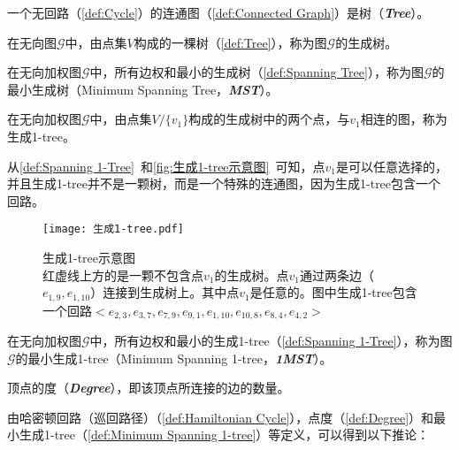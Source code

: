 \begin{definition}[树]
    \label{def:Tree}
    一个无回路（\autoref{def:Cycle}）的连通图（\autoref{def:Connected Graph}）是树（\emph{\textbf{Tree}}）。
\end{definition}
\begin{definition}[生成树]
    \label{def:Spanning Tree}
    在无向图$\mathcal{G}$中，由点集$V$构成的一棵树（\autoref{def:Tree}），称为图$\mathcal{G}$的生成树。
\end{definition}
\begin{definition}[最小生成树]
    \label{def:Minimum Spanning Tree}
    在无向加权图$\mathcal{G}$中，所有边权和最小的生成树（\autoref{def:Spanning Tree}），称为图$\mathcal{G}$的最小生成树（Minimum Spanning Tree，\emph{\textbf{MST}}）。
\end{definition}
\begin{definition}[生成1-tree]
    \label{def:Spanning 1-Tree}
    在无向加权图$\mathcal{G}$中，由点集$V/\{v_1\}$构成的生成树中的两个点，与$v_1$相连的图，称为生成1-tree。
\end{definition}
\par
从\autoref{def:Spanning 1-Tree}~和\autoref{fig:生成1-tree示意图}~可知，点$v_1$是可以任意选择的，并且生成1-tree并不是一颗树，而是一个特殊的连通图，因为生成1-tree包含一个回路。
\begin{figure}[htb]
    \texttt{[image: 生成1-tree.pdf]}
    \caption[生成1-tree示意图]{生成1-tree示意图 \\ 红虚线上方的是一颗不包含点$v_1$的生成树。点$v_1$通过两条边（$e_{1,9}, e_{1,10}$）连接到生成树上。其中点$v_1$是任意的。图中生成1-tree包含一个回路$<e_{2,3}, e_{3,7}, e_{7,9}, e_{9,1}, e_{1,10}, e_{10,8}, e_{8,4}, e_{4,2}>$}
    \label{fig:生成1-tree示意图}
\end{figure}
\begin{definition}
    \label{def:Minimum Spanning 1-tree}
    在无向加权图$\mathcal{G}$中，所有边权和最小的生成1-tree（\autoref{def:Spanning 1-Tree}），称为图$\mathcal{G}$的最小生成1-tree（Minimum Spanning 1-tree，\emph{\textbf{1MST}}）。
\end{definition}
\begin{definition}[点度]
    \label{def:Degree}
    顶点的度（\emph{\textbf{Degree}}），即该顶点所连接的边的数量。    
\end{definition}
\par
由哈密顿回路（巡回路径）（\autoref{def:Hamiltonian Cycle}），点度（\autoref{def:Degree}）和最小生成1-tree（\autoref{def:Minimum Spanning 1-tree}）等定义，可以得到以下推论：
